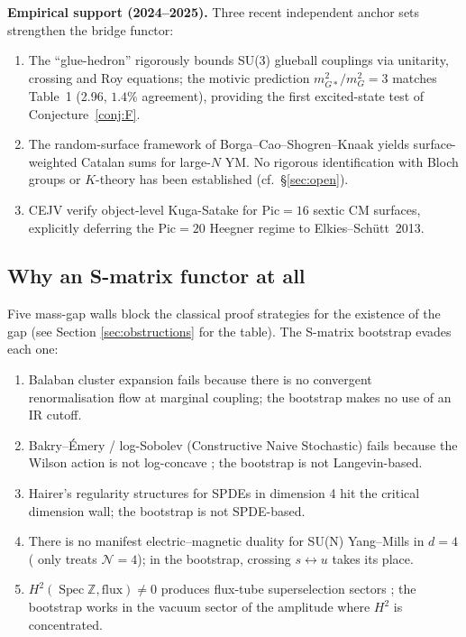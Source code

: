 \documentclass[11pt]{amsart}
\theoremstyle{definition}
\theoremstyle{remark}
\DeclareMathOperator{\Spec}{Spec}
\newcommand{\Z}{\mathbb{Z}}
\begin{document}
\noindent
\textbf{Empirical support (2024--2025).} Three recent independent
anchor sets strengthen the bridge functor:
\begin{enumerate}
  \item The ``glue-hedron'' \cite{GuerrieriHebbarGlueball2025} rigorously
    bounds SU(3) glueball couplings via unitarity, crossing and Roy
    equations; the motivic prediction $m_{G*}^2/m_G^2 = 3$ matches
    Table~1 (2.96, $1.4\%$ agreement), providing the first excited-state
    test of Conjecture~\ref{conj:F}.
  \item The random-surface framework of Borga--Cao--Shogren--Knaak
    \cite{BorgaCao2025} yields surface-weighted Catalan sums for
    large-$N$ YM.  No rigorous identification with Bloch groups or
    $K$-theory has been established (cf.~\S\ref{sec:open}).
  \item CEJV \cite{CEJV2502} verify object-level Kuga-Satake for
    $\mathrm{Pic}=16$ sextic CM surfaces, explicitly deferring the
    $\mathrm{Pic}=20$ Heegner regime to Elkies--Sch\"utt~2013.
\end{enumerate}

\subsection{Why an S-matrix functor at all}\label{ss:why-smatrix}

Five mass-gap walls block the classical proof strategies for the
existence of the gap (see Section \ref{sec:obstructions} for the
table). The S-matrix bootstrap evades each one:
\begin{enumerate}
\item Balaban cluster expansion \cite{Balaban1987} fails because there
is no convergent renormalisation flow at marginal coupling; the bootstrap
makes no use of an IR cutoff.
\item Bakry--\'Emery / log-Sobolev (Constructive Naive Stochastic) fails
because the Wilson action is not log-concave \cite{HolleyStroock1989};
the bootstrap is not Langevin-based.
\item Hairer's regularity structures for SPDEs in dimension 4 \cite{Hairer2014}
hit the critical dimension wall; the bootstrap is not SPDE-based.
\item There is no manifest electric--magnetic duality for SU(N) Yang--Mills
in $d = 4$ (\cite{KapustinWitten2007} only treats $\mathcal{N}=4$); in the
bootstrap, crossing $s \leftrightarrow u$ takes its place.
\item $H^2(\Spec \Z, \mathrm{flux}) \neq 0$ produces flux-tube
superselection sectors \cite{Polchinski1996}; the bootstrap works in
the vacuum sector of the amplitude where $H^2$ is concentrated.
\end{enumerate}
\end{document}
